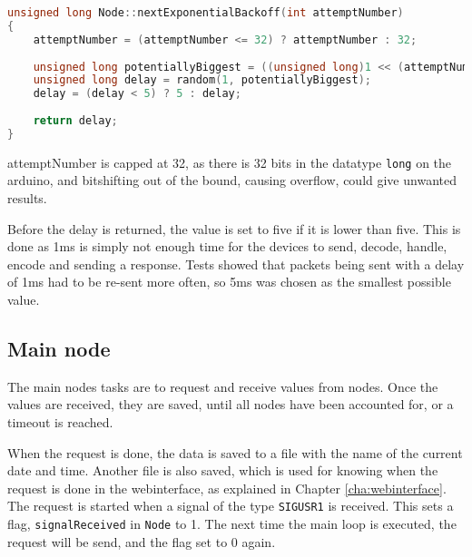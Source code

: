 \begin{lstlisting}[language=C,caption={Exponential backoff on the sensor nodes. In Node.cpp.},label={lst:expbackoff}]
unsigned long Node::nextExponentialBackoff(int attemptNumber)
{
    attemptNumber = (attemptNumber <= 32) ? attemptNumber : 32;
    
    unsigned long potentiallyBiggest = ((unsigned long)1 << (attemptNumber - 1));
    unsigned long delay = random(1, potentiallyBiggest);
    delay = (delay < 5) ? 5 : delay;
    
    return delay;
}
\end{lstlisting}
attemptNumber is capped at 32, as there is 32 bits in the datatype \texttt{long} on the arduino, and bitshifting out of the bound, causing overflow, could give unwanted results.

Before the delay is returned, the value is set to five if it is lower than five. This is done as 1ms is simply not enough time for the devices to send, decode, handle, encode and sending a response. Tests showed that packets being sent with a delay of 1ms had to be re-sent more often, so 5ms was chosen as the smallest possible value.

\subsection{Main node} \label{cha:signalhandling}
The main nodes tasks are to request and receive values from nodes. Once the values are received, they are saved, until all nodes have been accounted for, or a timeout is reached.

When the request is done, the data is saved to a file with the name of the current date and time. Another file is also saved, which is used for knowing when the request is done in the webinterface, as explained in Chapter \ref{cha:webinterface}. The request is started when a signal of the type \texttt{SIGUSR1} is received. This sets a flag, \texttt{signalReceived} in \texttt{Node} to 1. The next time the main loop is executed, the request will be send, and the flag set to 0 again.
